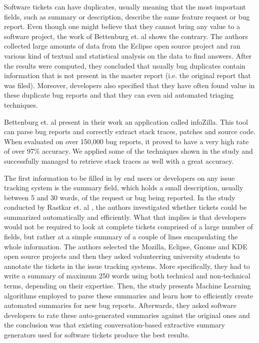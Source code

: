 \documentclass{mpaper}
\begin{document}
Software tickets can have duplicates, usually meaning that the most important fields, such 
as summary or description, describe the same feature request or bug report. Even though 
one might believe that they cannot bring any value to a software project, the work of 
Bettenburg et. al \cite{bettenburg2008duplicate} shows the contrary.
The authors collected large amounts of data from the Eclipse open source project and ran
various kind of textual and statistical analysis on the data to find answers.
After the results were computed, they concluded that usually bug duplicates contain 
information that is not present in the master report (i.e. the original report that was 
filed). Moreover, developers also specified that they have often found value in these 
duplicate bug reports and that they can even aid automated triaging techniques.

Bettenburg et. al \cite{bettenburg2012using} present in their work an application
called infoZilla. This tool can
parse bug reports and correctly extract stack traces, patches and source code. 
When evaluated on over 150,000 bug reports, it proved to have a very high rate of over 97\% accuracy.
We applied some of the techniques shown in the study and successfully managed to 
retrieve stack traces as well with a great accuracy.

The first information to be filled in by end users or developers on any issue tracking system
is the summary field, which holds a small description, usually between 5 and 30 words, of 
the request or bug being reported. In the study conducted by Rastkar et. al \cite{rastkar2010summarizing}, 
the authors investigated whether tickets could be summarized automatically and efficiently. What 
that implies is that developers would not be required to look at complete tickets comprised 
of a large number of fields, but rather at a simple summary of a couple of lines 
encapsulating the whole information. The authors selected the Mozilla, Eclipse, Gnome and KDE 
open source projects and then they asked volunteering university students to annotate 
the tickets in the issue tracking systems. More specifically, they had to write a summary 
of maximum 250 words using both technical and non-technical terms, depending on their expertise. 
Then, the study presents Machine Learning algorithms employed to parse these summaries and 
learn how to efficiently create automated summaries for new bug reports. Afterwards, they asked 
software developers to rate these auto-generated summaries against the original ones and 
the conclusion was that existing conversation-based extractive summary generators used 
for software tickets produce the best results.
\end{document}
